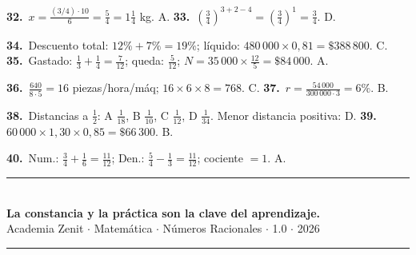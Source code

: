 \documentclass[11pt, letterpaper]{article}
\begin{document}
\textbf{32.}~$x=\tfrac{(3/4)\cdot10}{6}=\tfrac{5}{4}=1\tfrac{1}{4}$ kg. A. \quad
\textbf{33.}~$\left(\tfrac{3}{4}\right)^{3+2-4}=\left(\tfrac{3}{4}\right)^{1}=\tfrac{3}{4}$. D.

\textbf{34.}~Descuento total: $12\%+7\%=19\%$; l\'iquido: $480\,000\times0{,}81=\$388\,800$. C. \quad
\textbf{35.}~Gastado: $\tfrac{1}{3}+\tfrac{1}{4}=\tfrac{7}{12}$; queda: $\tfrac{5}{12}$; $N=35\,000\times\tfrac{12}{5}=\$84\,000$. A.

\textbf{36.}~$\tfrac{640}{8\cdot5}=16$ piezas/hora/m\'aq; $16\times6\times8=768$. C. \quad
\textbf{37.}~$r=\tfrac{54\,000}{300\,000\cdot3}=6\%$. B.

\textbf{38.}~Distancias a $\tfrac{1}{2}$: A $\tfrac{1}{18}$, B $\tfrac{1}{10}$, C $\tfrac{1}{12}$, D $\tfrac{1}{34}$. Menor distancia positiva: D. \quad
\textbf{39.}~$60\,000\times1{,}30\times0{,}85=\$66\,300$. B.

\textbf{40.}~Num.: $\tfrac{3}{4}+\tfrac{1}{6}=\tfrac{11}{12}$; Den.: $\tfrac{5}{4}-\tfrac{1}{3}=\tfrac{11}{12}$; cociente $= 1$. A.

\vspace{8pt}
\begin{center}
  \rule{\linewidth}{1.5pt}\\[4pt]
  {\large\bfseries\color{zenitnavy} La constancia y la pr\'actica son la clave del aprendizaje.}\\[2pt]
  {\color{zenitgold}\small Academia Zenit $\cdot$ Matem\'atica $\cdot$ N\'umeros Racionales $\cdot$ 1.0 $\cdot$ 2026}\\[4pt]
  \rule{\linewidth}{1.5pt}
\end{center}
\end{document}
